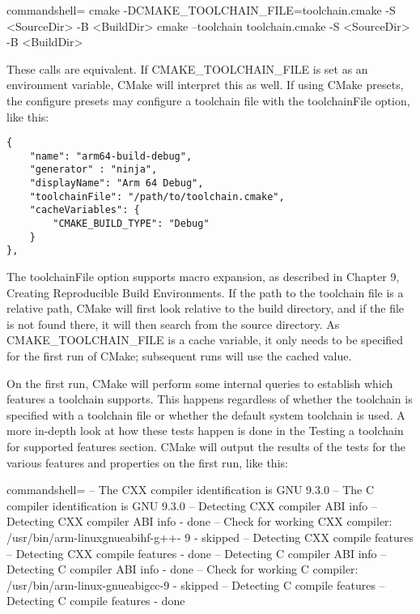 \begin{tcblisting}{commandshell={}}
cmake -DCMAKE_TOOLCHAIN_FILE=toolchain.cmake -S <SourceDir> -B
	<BuildDir>
cmake --toolchain toolchain.cmake -S <SourceDir> -B <BuildDir>
\end{tcblisting}

These calls are equivalent. If CMAKE\_TOOLCHAIN\_FILE is set as an environment variable, CMake will interpret this as well. If using CMake presets, the configure presets may configure a toolchain file with the toolchainFile option, like this:

\begin{lstlisting}[style=styleCMake]
{
	"name": "arm64-build-debug",
	"generator" : "ninja",
	"displayName": "Arm 64 Debug",
	"toolchainFile": "/path/to/toolchain.cmake",
	"cacheVariables": {
		"CMAKE_BUILD_TYPE": "Debug"
	}
},
\end{lstlisting}

The toolchainFile option supports macro expansion, as described in Chapter 9, Creating Reproducible Build Environments. If the path to the toolchain file is a relative path, CMake will first look relative to the build directory, and if the file is not found there, it will then search from the source directory. As CMAKE\_TOOLCHAIN\_FILE is a cache variable, it only needs to be specified for the first run of CMake; subsequent runs will use the cached value.

On the first run, CMake will perform some internal queries to establish which features a toolchain supports. This happens regardless of whether the toolchain is specified with a toolchain file or whether the default system toolchain is used. A more in-depth look at how these tests happen is done in the Testing a toolchain for supported features section. CMake will output the results of the tests for the various features and properties on the first run, like this:

{\footnotesize
\begin{tcblisting}{commandshell={}}
-- The CXX compiler identification is GNU 9.3.0
-- The C compiler identification is GNU 9.3.0
-- Detecting CXX compiler ABI info
-- Detecting CXX compiler ABI info - done
-- Check for working CXX compiler: /usr/bin/arm-linuxgnueabihf-g++- 9 - skipped
-- Detecting CXX compile features
-- Detecting CXX compile features - done
-- Detecting C compiler ABI info
-- Detecting C compiler ABI info - done
-- Check for working C compiler: /usr/bin/arm-linux-gnueabigcc-9 - skipped
-- Detecting C compile features
-- Detecting C compile features - done
\end{tcblisting}
}

